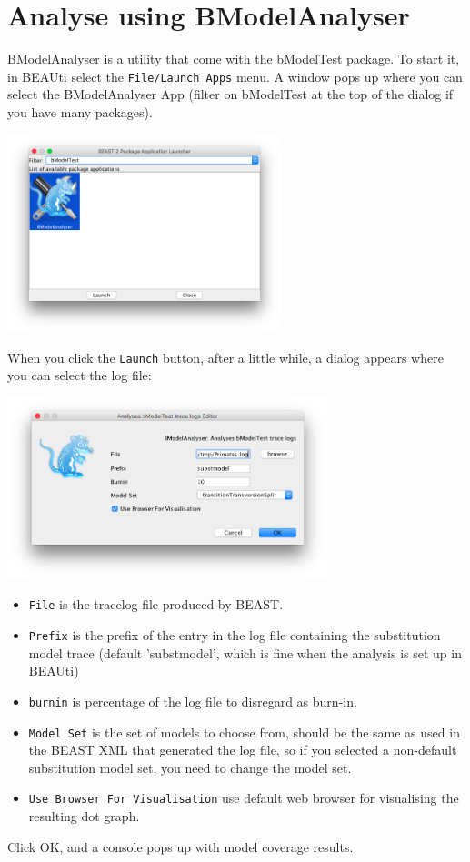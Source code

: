 \documentclass{article}
\begin{document}
\section*{Analyse using BModelAnalyser}
BModelAnalyser is a utility that come with the bModelTest package. To start it, in BEAUti select the {\tt File/Launch Apps} menu. A window pops up where you can select the BModelAnalyser App (filter on bModelTest at the top of the dialog if you have many packages).

\begin{center}
\includegraphics[width=0.6\textwidth]{appstore}
\end{center}

When you click the {\tt Launch} button, after a little while, a dialog appears where you can select the log file:

\begin{center}
\includegraphics[width=0.7\textwidth]{bModelTestDlg}
\end{center}

\begin{itemize}
\item {\tt File} is the tracelog file produced by BEAST.
\item {\tt Prefix} is the prefix of the entry in the log file containing the substitution model trace (default 'substmodel', which is fine when the analysis is set up in BEAUti)
\item {\tt burnin} is percentage of the log file to disregard as burn-in.
\item {\tt Model Set} is the set of models to choose from, should be the same as used in the BEAST XML that generated the log file, so if you selected a non-default substitution model set, you need to change the model set.
\item {\tt Use Browser For Visualisation} use default web browser for visualising the resulting dot graph.
\end{itemize}
Click OK, and a console pops up with model coverage results.
\end{document}
